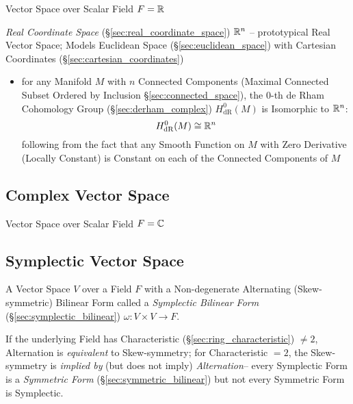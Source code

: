 Vector Space over Scalar Field $F = \mathbb{R}$

\fist \emph{Real Coordinate Space} (\S\ref{sec:real_coordinate_space})
$\mathbb{R}^n$ -- prototypical Real Vector Space; Models Euclidean Space
(\S\ref{sec:euclidean_space}) with Cartesian Coordinates
(\S\ref{sec:cartesian_coordinates})

\begin{itemize}
  \item for any Manifold $M$ with $n$ Connected Components (Maximal Connected
    Subset Ordered by Inclusion \S\ref{sec:connected_space}), the $0$-th de Rham
    Cohomology Group (\S\ref{sec:derham_complex}) $H_{\mathrm{dR}}^0(M)$ is
    Isomorphic to $\mathbb{R}^n$:
    \[
      H_{\mathrm{dR}}^0(M) \cong \mathbb{R}^n
    \]
    following from the fact that any Smooth Function on $M$ with Zero Derivative
    (Locally Constant) is Constant on each of the Connected Components of $M$
\end{itemize}


\subsection{Complex Vector Space}\label{sec:complex_vector_space}

Vector Space over Scalar Field $F = \mathbb{C}$



\subsection{Symplectic Vector Space}\label{sec:symplectic_vectorspace}

A Vector Space $V$ over a Field $F$ with a Non-degenerate Alternating
(Skew-symmetric) Bilinear Form called a \emph{Symplectic Bilinear Form}
(\S\ref{sec:symplectic_bilinear}) $\omega : V \times V \rightarrow F$.

If the underlying Field has Characteristic (\S\ref{sec:ring_characteristic})
$\neq 2$, Alternation is \emph{equivalent} to Skew-symmetry; for Characteristic
$=2$, the Skew-symmetry is \emph{implied by} (but does not imply)
\emph{Alternation}-- every Symplectic Form is a \emph{Symmetric Form}
(\S\ref{sec:symmetric_bilinear}) but not every Symmetric Form is Symplectic.

